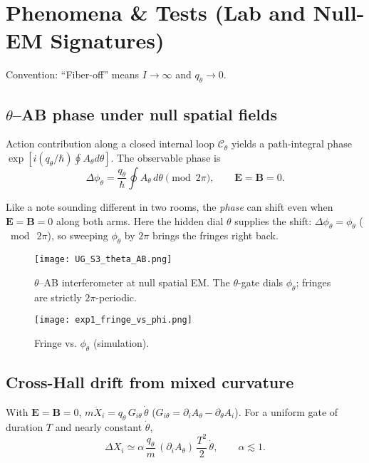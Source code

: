 \section{Phenomena \& Tests (Lab and Null-EM Signatures)}\label{sec:phenomenology}

Convention: “Fiber-off” means $I\to\infty$ and $q_\theta\to 0$.

\subsection{\texorpdfstring{$\theta$}{theta}--AB phase under null spatial fields}\label{sec:theta-ab}
Action contribution along a closed internal loop $\mathcal C_\theta$ yields a path-integral phase $\exp[i(q_\theta/\hbar)\oint A_\theta d\theta]$. The observable phase is
\begin{equation}
 \Delta\phi_\theta = \frac{q_\theta}{\hbar}\oint A_\theta\,d\theta \pmod{2\pi},\qquad \bm E=\bm B=0.
\end{equation}

\begin{idea}
Like a note sounding different in two rooms, the \emph{phase} can shift even when $\mathbf{E}=\mathbf{B}=0$ along both arms. Here the hidden dial $\theta$ supplies the shift: $\Delta\phi_\theta=\phi_\theta$ (\(\bmod\ 2\pi\)), so sweeping $\phi_\theta$ by $2\pi$ brings the fringes right back.
\end{idea}

\begin{figure}[htbp]
  \centering
  \texttt{[image: UG\_S3\_theta\_AB.png]}
  \caption{$\theta$--AB interferometer at null spatial EM. The $\theta$-gate dials $\phi_\theta$; fringes are strictly $2\pi$-periodic.}
  \label{fig:theta-ab-cartoon}
\end{figure}

\begin{figure}[htbp]
  \centering
  \texttt{[image: exp1\_fringe\_vs\_phi.png]}
  \caption{Fringe vs. $\phi_\theta$ (simulation).}
  \label{fig:theta-ab-fringe}
\end{figure}


\subsection{Cross-Hall drift from mixed curvature}\label{sec:cross-hall}
With $\bm E=\bm B=0$, $m\ddot X_i = q_\theta\,G_{i\theta}\,\dot\theta$ ($G_{i\theta}=\partial_iA_\theta-\partial_\theta A_i$). For a uniform gate of duration $T$ and nearly constant $\dot\theta$,
\begin{equation}
 \Delta X_i \simeq \alpha\,\frac{q_\theta}{m}\,(\partial_iA_\theta)\,\frac{T^2}{2}\,\dot\theta,\qquad \alpha\lesssim 1.
\end{equation}

